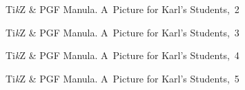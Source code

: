 \documentclass[a4paper,11pt]{article}
\begin{document}
\begin{figure}[ht]

  \centering

  \begin{tikzpicture}



  \end{tikzpicture}

  \caption{Ti\textit{k}Z \& PGF Manula. A~Picture for Karl's Students,~2}

\end{figure}





\begin{figure}[ht]

  \centering

  \begin{tikzpicture}








  \end{tikzpicture}

  \caption{Ti\textit{k}Z \& PGF Manula. A~Picture for Karl's Students,~3}

\end{figure}





\begin{figure}[ht]

  \centering

  \begin{tikzpicture}








  \end{tikzpicture}

  \caption{Ti\textit{k}Z \& PGF Manula. A~Picture for Karl's Students,~4}

\end{figure}





\begin{figure}[ht]

  \centering

  \begin{tikzpicture}







  \end{tikzpicture}

  \caption{Ti\textit{k}Z \& PGF Manula. A~Picture for Karl's Students,~5}

\end{figure}
\end{document}
